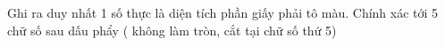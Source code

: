 Ghi ra duy nhất 1 số thực là diện tích phần giấy phải tô màu. Chính xác tới 5 chữ số sau dấu phẩy ( không làm tròn, cắt tại chữ số thứ 5)